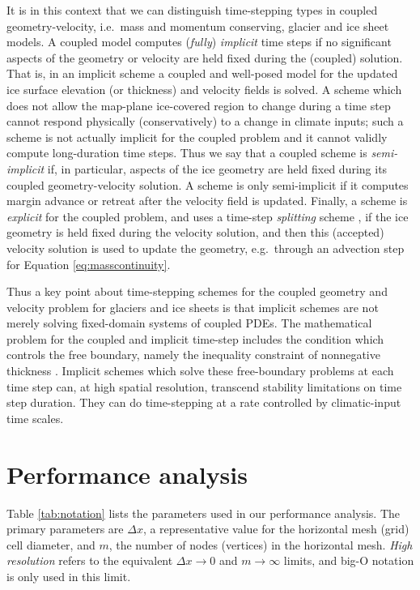 \documentclass[review,letterpaper]{igs}
\begin{document}
It is in this context that we can distinguish time-stepping types in coupled geometry-velocity, i.e.~mass and momentum conserving, glacier and ice sheet models.  A coupled model computes (\emph{fully}) \emph{implicit} time steps if no significant aspects of the geometry or velocity are held fixed during the (coupled) solution.  That is, in an implicit scheme a coupled and well-posed model for the updated ice surface elevation (or thickness) and velocity fields is solved.  A scheme which does not allow the map-plane ice-covered region to change during a time step cannot respond physically (conservatively) to a change in climate inputs; such a scheme is not actually implicit for the coupled problem and it cannot validly compute long-duration time steps.  Thus we say that a coupled scheme is \emph{semi-implicit} if, in particular, aspects of the ice geometry are held fixed during its coupled geometry-velocity solution.  A scheme is only semi-implicit if it computes margin advance or retreat after the velocity field is updated.  Finally, a scheme is \emph{explicit} for the coupled problem, and uses a time-step \emph{splitting} scheme \citep{HundsdorferVerwer2003}, if the ice geometry is held fixed during the velocity solution, and then this (accepted) velocity solution is used to update the geometry, e.g.~through an advection step for Equation \eqref{eq:masscontinuity}.

Thus a key point about time-stepping schemes for the coupled geometry and velocity problem for glaciers and ice sheets is that implicit schemes are not merely solving fixed-domain systems of coupled PDEs.  The mathematical problem for the coupled and implicit time-step includes the condition which controls the free boundary, namely the inequality constraint of nonnegative thickness \citep{Bueler2021conservation}.  Implicit schemes which solve these free-boundary problems at each time step can, at high spatial resolution, transcend stability limitations on time step duration.  They can do time-stepping at a rate controlled by climatic-input time scales.


\section{Performance analysis}

Table \ref{tab:notation} lists the parameters used in our performance analysis.  The primary parameters are $\Delta x$, a representative value for the horizontal mesh (grid) cell diameter, and $m$, the number of nodes (vertices) in the horizontal mesh.  \emph{High resolution} refers to the equivalent $\Delta x\to 0$ and $m\to\infty$ limits, and big-O notation is only used in this limit.
\end{document}
